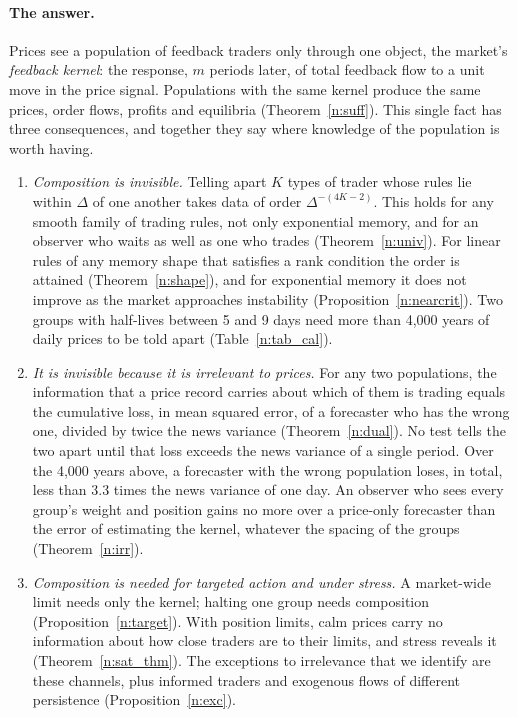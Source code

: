 \paragraph{The answer.} Prices see a population of feedback traders only through one object, the market's \emph{feedback kernel}: the response, $m$ periods later, of total feedback flow to a unit move in the price signal. Populations with the same kernel produce the same prices, order flows, profits and equilibria (Theorem~\ref{n:suff}). This single fact has three consequences, and together they say where knowledge of the population is worth having.
\begin{enumerate}[label=(\alph*),leftmargin=*,itemsep=2pt]
\item \emph{Composition is invisible.} Telling apart $K$ types of trader whose rules lie within $\Delta$ of one another takes data of order $\Delta^{-(4K-2)}$. This holds for any smooth family of trading rules, not only exponential memory, and for an observer who waits as well as one who trades (Theorem~\ref{n:univ}). For linear rules of any memory shape that satisfies a rank condition the order is attained (Theorem~\ref{n:shape}), and for exponential memory it does not improve as the market approaches instability (Proposition~\ref{n:nearcrit}). Two groups with half-lives between 5 and 9 days need more than 4{,}000 years of daily prices to be told apart (Table~\ref{n:tab_cal}).
\item \emph{It is invisible because it is irrelevant to prices.} For any two populations, the information that a price record carries about which of them is trading equals the cumulative loss, in mean squared error, of a forecaster who has the wrong one, divided by twice the news variance (Theorem~\ref{n:dual}). No test tells the two apart until that loss exceeds the news variance of a single period. Over the 4{,}000 years above, a forecaster with the wrong population loses, in total, less than $3.3$ times the news variance of one day. An observer who sees every group's weight and position gains no more over a price-only forecaster than the error of estimating the kernel, whatever the spacing of the groups (Theorem~\ref{n:irr}).
\item \emph{Composition is needed for targeted action and under stress.} A market-wide limit needs only the kernel; halting one group needs composition (Proposition~\ref{n:target}). With position limits, calm prices carry no information about how close traders are to their limits, and stress reveals it (Theorem~\ref{n:sat_thm}). The exceptions to irrelevance that we identify are these channels, plus informed traders and exogenous flows of different persistence (Proposition~\ref{n:exc}).
\end{enumerate}
